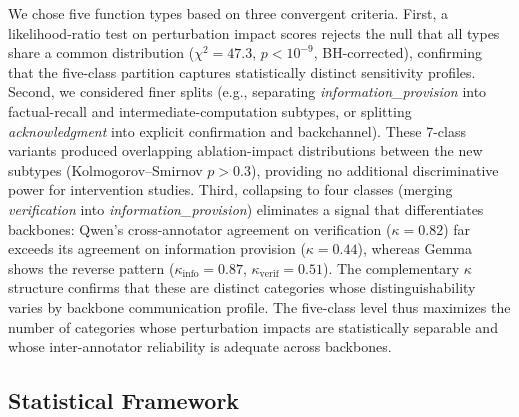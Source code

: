 We chose five function types based on three convergent criteria. First, a likelihood-ratio test on perturbation impact scores rejects the null that all types share a common distribution ($\chi^2 = 47.3$, $p < 10^{-9}$, BH-corrected), confirming that the five-class partition captures statistically distinct sensitivity profiles. Second, we considered finer splits (e.g., separating \emph{information\_provision} into factual-recall and intermediate-computation subtypes, or splitting \emph{acknowledgment} into explicit confirmation and backchannel). These 7-class variants produced overlapping ablation-impact distributions between the new subtypes (Kolmogorov--Smirnov $p > 0.3$), providing no additional discriminative power for intervention studies. Third, collapsing to four classes (merging \emph{verification} into \emph{information\_provision}) eliminates a signal that differentiates backbones: Qwen's cross-annotator agreement on verification ($\kappa = 0.82$) far exceeds its agreement on information provision ($\kappa = 0.44$), whereas Gemma shows the reverse pattern ($\kappa_{\mathrm{info}} = 0.87$, $\kappa_{\mathrm{verif}} = 0.51$). The complementary $\kappa$ structure confirms that these are distinct categories whose distinguishability varies by backbone communication profile. The five-class level thus maximizes the number of categories whose perturbation impacts are statistically separable and whose inter-annotator reliability is adequate across backbones.

\subsection{Statistical Framework}
\label{app:stat_framework_details}

